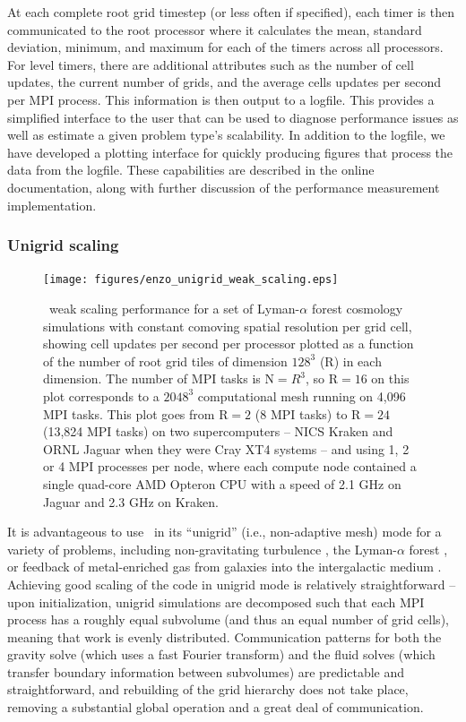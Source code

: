 At each complete root grid timestep (or less often if specified),
each timer is then communicated to the root processor where it
calculates the mean, standard deviation, minimum, and maximum for each
of the timers across all processors.  For level timers, there are additional
attributes such as the number of cell updates, the current number of
grids, and the average cells updates per second per MPI process.  This
information is then 
output to a logfile.  This provides a simplified interface to the user
that can be used to diagnose performance issues as well as estimate a
given problem type's scalability.  In addition to the logfile, we have
developed a plotting interface for quickly producing figures that
process the data from the logfile.  These capabilities are described
in the online documentation, along with further discussion of the
performance measurement implementation.

\subsubsection{Unigrid scaling}
\label{sec:weak_scaling}

\begin{figure}
\begin{center}
\texttt{[image: figures/enzo\_unigrid\_weak\_scaling.eps]}
\caption{\enzo\ weak scaling performance for a set of Lyman-$\alpha$
forest cosmology simulations with constant comoving spatial resolution
per grid cell, showing cell updates per second per processor 
plotted as a function of the number of root grid tiles of dimension
$128^3$ (R) in each dimension.  The number of MPI tasks is N$ = R^3$,
so R$ = 16$ on this plot corresponds to a $2048^3$ computational mesh
running on 4,096 MPI tasks.  This plot goes from R$ = 2$ (8 MPI tasks)
to R$ = 24$ (13,824 MPI tasks) on two supercomputers -- NICS Kraken
and ORNL Jaguar when they were Cray XT4 systems -- and using 1, 2 or 4
MPI processes per node, where each compute node contained a single
quad-core AMD Opteron CPU with a speed of 2.1 GHz on Jaguar and 2.3
GHz on Kraken.}
\label{fig.uniscale}
\end{center}
\end{figure}

It is advantageous to use \enzo\ in its ``unigrid'' (i.e.,
non-adaptive mesh) mode for a variety of problems, including
non-gravitating turbulence
\citep[e.g.,][]{2002ApJ...569L.127K,Kritsuk04, 2007ApJ...665..416K,
2009ASPC..406...15K}, the Lyman-$\alpha$ forest
\citep{2005MNRAS.361...70J,2009MNRAS.399.1934P}, or feedback of
metal-enriched gas from galaxies into the intergalactic medium
\citep{2004ApJ...601L.115N,2011ApJ...731....6S}.  Achieving good
scaling of the code in unigrid mode is relatively straightforward --
upon initialization, unigrid simulations are decomposed such that each
MPI process has a roughly equal subvolume (and thus an equal number of grid
cells), meaning that work is evenly distributed.  Communication
patterns for both the gravity solve (which uses a fast Fourier
transform) and the fluid solves (which transfer boundary information
between subvolumes) are predictable and straightforward, and
rebuilding of the grid hierarchy does not take place, removing a
substantial global operation and a great deal of communication.

